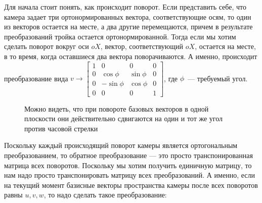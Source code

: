 \documentclass{article}
\begin{document}

Для начала стоит понять, как происходит поворот. Если представить себе, что камера задает три ортонормированных вектора, соответствующие осям, то один из векторов остается на месте, а два другие перемещаются, причем в результате преобразований тройка остается ортонормированной. Тогда если мы хотим сделать поворот вокруг оси $oX$, вектор, соответствующий $oX$, остается на месте, в то время, когда оставшиеся два вектора поворачиваются. А именно, происходит преобразование вида $v \to \begin{bmatrix} 1 & 0 & 0 & 0 \\ 0 & \cos \phi & \sin \phi & 0 \\ 0 & -\sin \phi & \cos \phi & 0 \\ 0 & 0 & 0 & 1\end{bmatrix}$, где $\phi$~--- требуемый угол.

\begin{center}
\begin{figure}[H]
\caption{Можно видеть, что при повороте базовых векторов в одной плоскости они действительно сдвигаются на один и тот же угол против часовой стрелки}
\label{ris:image}
\end{figure}
\end{center}


Поскольку каждый происходящий поворот камеры является ортогональным преобразованием, то обратное преобразование --- это просто транспонированная матрица всех поворотов. Поскольку мы хотим получить единичную матрицу, то нам надо просто транспонировать матрицу всех преобразований. А именно, если на текущий момент базисные векторы пространства камеры после всех поворотов равны $u, v, w$, то надо сделать такое преобразование:
\end{document}
